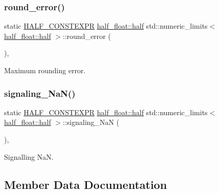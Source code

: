 \subsubsection{\texorpdfstring{round\+\_\+error()}{round\_error()}}
{\footnotesize\ttfamily static \hyperlink{half_8hpp_ace3116a3e2cd66dd15780b92060987c7}{H\+A\+L\+F\+\_\+\+C\+O\+N\+S\+T\+E\+X\+PR} \hyperlink{classhalf__float_1_1half}{half\+\_\+float\+::half} std\+::numeric\+\_\+limits$<$ \hyperlink{classhalf__float_1_1half}{half\+\_\+float\+::half} $>$\+::round\+\_\+error (\begin{DoxyParamCaption}{ }\end{DoxyParamCaption})\hspace{0.3cm}{\ttfamily [inline]}, {\ttfamily [static]}}



Maximum rounding error. 

\mbox{\label{classstd_1_1numeric__limits_3_01half__float_1_1half_01_4_ae0451fbc23a2d62bfd9f6bbf7956b4f3}} 
\subsubsection{\texorpdfstring{signaling\+\_\+\+Na\+N()}{signaling\_NaN()}}
{\footnotesize\ttfamily static \hyperlink{half_8hpp_ace3116a3e2cd66dd15780b92060987c7}{H\+A\+L\+F\+\_\+\+C\+O\+N\+S\+T\+E\+X\+PR} \hyperlink{classhalf__float_1_1half}{half\+\_\+float\+::half} std\+::numeric\+\_\+limits$<$ \hyperlink{classhalf__float_1_1half}{half\+\_\+float\+::half} $>$\+::signaling\+\_\+\+NaN (\begin{DoxyParamCaption}{ }\end{DoxyParamCaption})\hspace{0.3cm}{\ttfamily [inline]}, {\ttfamily [static]}}



Signalling NaN. 



\subsection{Member Data Documentation}
\mbox{\label{classstd_1_1numeric__limits_3_01half__float_1_1half_01_4_a25dd523e9495b75166757d5f73197068}} 
